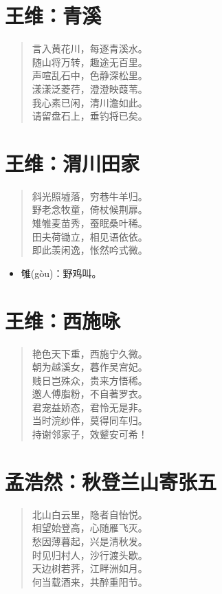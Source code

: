 \documentclass[12pt,oneside]{book}
\newenvironment{shici}{
\begin{verse}
\centering\large\hspace{12pt}}
{\end{verse}}
\begin{document}
\chapter{王维：青溪}
\begin{shici}
言入黄花川，每逐青溪水。\\
随山将万转，趣途无百里。\\
声喧乱石中，色静深松里。\\
漾漾泛菱荇，澄澄映葭苇。\\
我心素已闲，清川澹如此。\\
请留盘石上，垂钓将已矣。
\end{shici}

\chapter{王维：渭川田家}
\begin{shici}
斜光照墟落，穷巷牛羊归。\\
野老念牧童，倚杖候荆扉。\\
雉雊麦苗秀，蚕眠桑叶稀。\\
田夫荷锄立，相见语依依。\\
即此羡闲逸，怅然吟式微。
\end{shici}


\begin{itemize}
\item 雊(gòu)：野鸡叫。
\end{itemize}

\chapter{王维：西施咏}
\begin{shici}
艳色天下重，西施宁久微。\\
朝为越溪女，暮作吴宫妃。\\
贱日岂殊众，贵来方悟稀。\\
邀人傅脂粉，不自著罗衣。\\
君宠益娇态，君怜无是非。\\
当时浣纱伴，莫得同车归。\\
持谢邻家子，效颦安可希！
\end{shici}

\chapter{孟浩然：秋登兰山寄张五}
\begin{shici}
北山白云里，隐者自怡悦。\\
相望始登高，心随雁飞灭。\\
愁因薄暮起，兴是清秋发。\\
时见归村人，沙行渡头歇。\\
天边树若荠，江畔洲如月。\\
何当载酒来，共醉重阳节。
\end{shici}
\end{document}
